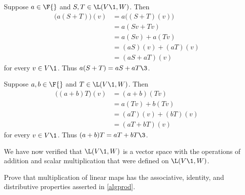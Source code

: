 \begin{Solution}
Suppose $a \in \F{}$ and $S, T \in \L(V\1, W)$. Then
\begin{align*}
\bigl( a(S + T) \bigr)(v) &= a \bigl( (S + T)(v) \bigr) \\
&= a(Sv + Tv) \\
&= a (Sv) + a (Tv) \\
&= (aS)(v) + (aT)(v) \\
&= (aS + aT)(v)
\end{align*}
for every $v \in V\1$. Thus $a(S + T) = aS + aT\3$.

Suppose $a, b \in \F{}$ and $T \in \L(V\1, W)$. Then
\begin{align*}
\bigl( (a + b)T \bigr)(v) &= (a + b)(Tv) \\
&= a(Tv) + b(Tv) \\
&= (aT)(v) + (bT)(v) \\
&= (aT + bT)(v)
\end{align*}
for every $v \in V\1$. Thus $(a+b)T = aT + bT\3$.

We have now verified that $\L(V\1, W)$ is a vector space with the operations of addition and scalar multiplication that were defined on $\L(V\1, W)$.
\end{Solution}

\exercise
Prove that multiplication of linear maps has the associative, identity, and distributive properties asserted in \ref{algprod}.

